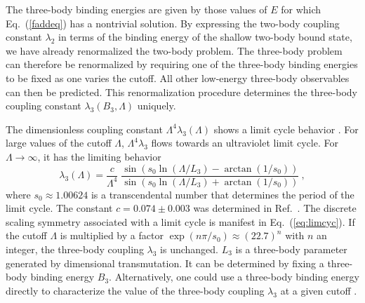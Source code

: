 \documentclass[prc,preprint,showpacs,tightenlines,%
nofootinbib]{revtex4}
\newcommand{\beq}{\begin{equation}}
\newcommand{\eeq}{\end{equation}}
\begin{document}
The three-body binding energies are given by those values of $E$
for which Eq.~(\ref{faddeq}) has a nontrivial solution.
By expressing the two-body coupling constant $\lambda_2$ in terms
of the binding energy of the shallow two-body bound state, 
we have already renormalized the two-body problem.
The three-body problem can therefore be renormalized by requiring one of
the three-body binding energies to be fixed as one varies the cutoff.
All other low-energy three-body observables can then be predicted.
This renormalization procedure determines the three-body coupling constant
$\lambda_3(B_3,\Lambda)$ uniquely. 

The dimensionless coupling constant $\Lambda^4 \lambda_3(\Lambda)$
shows a limit cycle behavior \cite{Platter04}.
For large values
of the cutoff $\Lambda$, $\Lambda^4\lambda_3$ flows towards an 
ultraviolet limit cycle.
For $\Lambda\to \infty$, it has the limiting behavior
\beq
\lambda_3(\Lambda)=\frac{c}{\Lambda^4} \;\frac{\sin(s_0 \ln(\Lambda/L_3)
  -\arctan(1/s_0))}{\sin(s_0 \ln(\Lambda/L_3)+\arctan(1/s_0))}~,
\label{eq:limcyc}
\eeq
where $s_0\approx 1.00624$ is a transcendental number that determines the
period of the limit cycle. The constant $c=0.074 \pm 0.003$ was 
determined in Ref.~\cite{Platter04}. The discrete scaling symmetry
associated with a limit cycle is manifest in Eq.~(\ref{eq:limcyc}).
If the cutoff $\Lambda$ is multiplied by a factor $\exp(n\pi/s_0) 
\approx (22.7)^n$ with $n$ an integer, the 
three-body coupling $\lambda_3$ is unchanged. 
$L_3$ is a three-body parameter generated by dimensional transmutation. 
It can be determined by fixing
a three-body binding energy $B_3$.
Alternatively, one could use a three-body binding energy directly
to characterize the value of the three-body coupling $\lambda_3$ at a 
given cutoff \cite{Afnan:2003bs,Platter:2006ev}.

%
\end{document}
